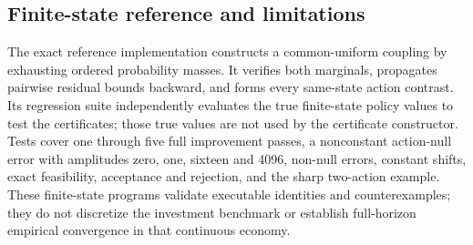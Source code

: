 \subsection{Finite-state reference and limitations}
The exact reference implementation constructs a common-uniform coupling by exhausting ordered probability masses. It verifies both marginals, propagates pairwise residual bounds backward, and forms every same-state action contrast. Its regression suite independently evaluates the true finite-state policy values to test the certificates; those true values are not used by the certificate constructor. Tests cover one through five full improvement passes, a nonconstant action-null error with amplitudes zero, one, sixteen and 4096, non-null errors, constant shifts, exact feasibility, acceptance and rejection, and the sharp two-action example. These finite-state programs validate executable identities and counterexamples; they do not discretize the investment benchmark or establish full-horizon empirical convergence in that continuous economy.
